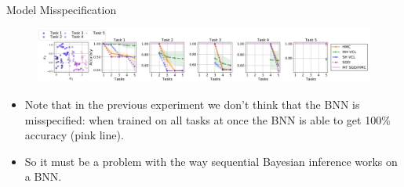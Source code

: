 \documentclass[12pt,aspectratio=169, handout]{beamer}
\let\olditem\item
\renewcommand\item{\olditem\justifying}
\begin{document}
\begin{frame}{Model Misspecification}

    \begin{figure}
		\centering
		\includegraphics[width=\textwidth]{"images/Fig3_pic.png"}
	\end{figure}


\begin{itemize}[<+->]
    \item Note that in the previous experiment we don't think that the BNN is misspecified: when trained on all tasks at once the BNN is able to get 100\% accuracy (pink line).
    \item So it must be a problem with the way sequential Bayesian inference works on a BNN.
\end{itemize}

\end{frame}
\end{document}
